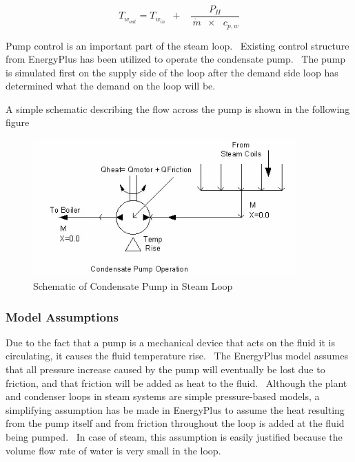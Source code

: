 \begin{equation}
{T_{{w_{out}}}} = {T_{{w_{in}}}}\,\,\, + \,\,\,\,\,\frac{{{P_H}}}{{\,\dot m\,\,\, \times \,\,\,\,{c_{p,w}}}}
\end{equation}

Pump control is an important part of the steam loop.~ Existing control structure from EnergyPlus has been utilized to operate the condensate pump.~ The pump is simulated first on the supply side of the loop after the demand side loop has determined what the demand on the loop will be.

A simple schematic describing the flow across the pump is shown in the following figure

\begin{figure}[hbtp] %
\centering
\includegraphics[width=0.9\textwidth, height=0.9\textheight, keepaspectratio=true]{media/image2040.png}
\caption{  Schematic of Condensate Pump in Steam Loop \protect \label{fig:schematic-of-condensate-pump-in-steam-loop}}
\end{figure}

\subsubsection{Model Assumptions}\label{model-assumptions-1}

Due to the fact that a pump is a mechanical device that acts on the fluid it is circulating, it causes the fluid temperature rise.~ The EnergyPlus model assumes that all pressure increase caused by the pump will eventually be lost due to friction, and that friction will be added as heat to the fluid.~ Although the plant and condenser loops in steam systems are simple pressure-based models, a simplifying assumption has be made in EnergyPlus to assume the heat resulting from the pump itself and from friction throughout the loop is added at the fluid being pumped.~ In case of steam, this assumption is easily justified because the volume flow rate of water is very small in the loop.


